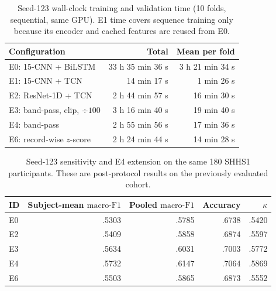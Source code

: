 \documentclass[10pt,a4paper]{article}
\newcommand{\mf}{\ensuremath{\mathrm{macro\text{-}F1}}}
\begin{document}
\begin{table}[H]
\centering\small
\caption{Seed-123 wall-clock training and validation time (10 folds, sequential, same GPU).
E1 time covers sequence training only because its encoder and cached features are reused from E0.}
\label{tab:sup_seed123_runtime}
\begin{tabular}{lrr}
\toprule
Configuration & Total & Mean per fold \\
\midrule
E0: 15-CNN + BiLSTM & 33 h 35 min 36 s & 3 h 21 min 34 s \\
E1: 15-CNN + TCN & 14 min 17 s & 1 min 26 s \\
E2: ResNet-1D + TCN & 2 h 44 min 57 s & 16 min 30 s \\
E3: band-pass, clip, $\div100$ & 3 h 16 min 40 s & 19 min 40 s \\
E4: band-pass & 2 h 55 min 56 s & 17 min 36 s \\
E6: record-wise $z$-score & 2 h 24 min 44 s & 14 min 28 s \\
\bottomrule
\end{tabular}
\end{table}

\begin{table}[H]
\centering\small
\caption{Seed-123 sensitivity and E4 extension on the same 180 SHHS1 participants.
These are post-protocol results on the previously evaluated cohort.}
\label{tab:sup_shhs_seed123}
\begin{tabular}{lrrrr}
\toprule
ID & Subject-mean \mf & Pooled \mf & Accuracy & $\kappa$ \\
\midrule
E0 & .5303 & .5785 & .6738 & .5420 \\
E2 & .5409 & .5858 & .6874 & .5597 \\
E3 & .5634 & .6031 & .7003 & .5772 \\
E4 & .5732 & .6147 & .7064 & .5869 \\
E6 & .5503 & .5865 & .6873 & .5552 \\
\bottomrule
\end{tabular}
\end{table}
\end{document}

